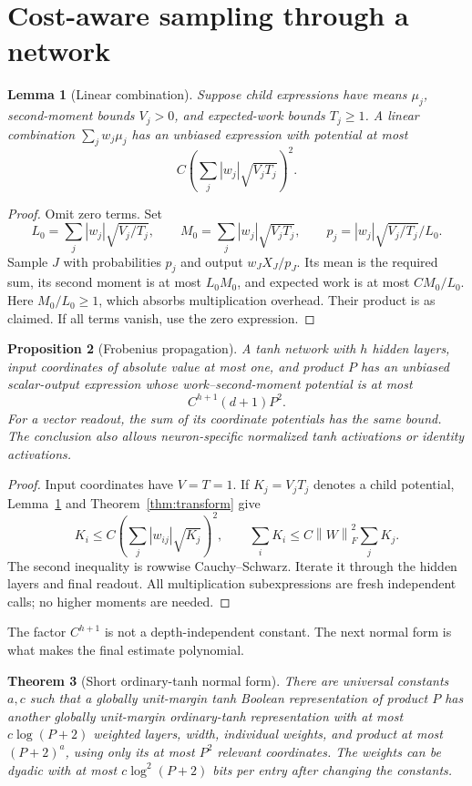 \documentclass[11pt]{article}
\newtheorem{theorem}{Theorem}[section]
\newtheorem{lemma}[theorem]{Lemma}
\newtheorem{proposition}[theorem]{Proposition}
\theoremstyle{remark}\newtheorem{remark}[theorem]{Remark}
\newcommand{\norm}[1]{\left\lVert#1\right\rVert}
\begin{document}
\section{Cost-aware sampling through a network}

\begin{lemma}[Linear combination]
\label{lem:linear}
Suppose child expressions have means $\mu_j$, second-moment bounds
$V_j>0$, and expected-work bounds $T_j\ge1$. A linear combination
$\sum_jw_j\mu_j$ has an unbiased expression with potential at most
\[
 C\left(\sum_j|w_j|\sqrt{V_jT_j}\right)^2.
\]
\end{lemma}
\begin{proof}
Omit zero terms. Set
\[
 L_0=\sum_j|w_j|\sqrt{V_j/T_j},\qquad
 M_0=\sum_j|w_j|\sqrt{V_jT_j},\qquad
 p_j=|w_j|\sqrt{V_j/T_j}/L_0.
\]
Sample $J$ with probabilities $p_j$ and output $w_JX_J/p_J$.
Its mean is the required sum, its second moment is at most $L_0M_0$,
and expected work is at most $CM_0/L_0$. Here $M_0/L_0\ge1$,
which absorbs multiplication overhead. Their product is as claimed.
If all terms vanish, use the zero expression.
\end{proof}

\begin{proposition}[Frobenius propagation]
\label{prop:potential}
A tanh network with $h$ hidden layers, input coordinates of absolute
value at most one, and product $P$ has an unbiased scalar-output
expression whose work--second-moment potential is at most
\[
 C^{h+1}(d+1)P^2.
\]
For a vector readout, the sum of its coordinate potentials has the
same bound. The conclusion also allows neuron-specific normalized
tanh activations or identity activations.
\end{proposition}
\begin{proof}
Input coordinates have $V=T=1$. If $K_j=V_jT_j$ denotes a child
potential, Lemma~\ref{lem:linear} and Theorem~\ref{thm:transform}
give
\[
 K_i\le C\left(\sum_j|w_{ij}|\sqrt{K_j}\right)^2,
 \qquad \sum_iK_i\le C\norm W_F^2\sum_jK_j.
\]
The second inequality is rowwise Cauchy--Schwarz. Iterate it through
the hidden layers and final readout. All multiplication subexpressions
are fresh independent calls; no higher moments are needed.
\end{proof}

The factor $C^{h+1}$ is not a depth-independent constant. The next
normal form is what makes the final estimate polynomial.

\begin{theorem}[Short ordinary-tanh normal form]
\label{thm:normal}
There are universal constants $a,c$ such that a globally unit-margin
tanh Boolean representation of product $P$ has another globally
unit-margin ordinary-tanh representation with at most
$c\log(P+2)$ weighted layers, width, individual weights, and product
at most $(P+2)^a$, using only its at most $P^2$ relevant coordinates.
The weights can be dyadic with at most $c\log^2(P+2)$ bits per entry
after changing the constants.
\end{theorem}
\end{document}

